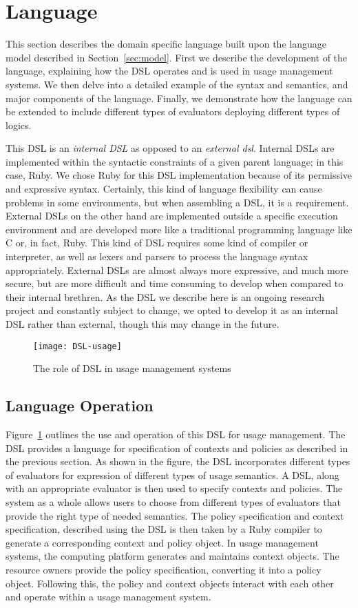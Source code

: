 \section{Language}\label{sec:language}
This section describes the domain specific language built upon the language model described in Section~\ref{sec:model}. First we describe the development of the language, explaining how the DSL operates and is used in usage management systems. We then delve into a detailed example of the syntax and semantics, and major components of the language. Finally, we demonstrate how the language can be extended to include different types of evaluators deploying different types of logics.

This DSL is an {\em internal DSL} as opposed to an {\em external dsl}.  Internal DSLs are implemented within the syntactic constraints of a given parent language; in this case, Ruby.  We chose Ruby for this DSL implementation because of its permissive and expressive syntax.  Certainly, this kind of language flexibility can cause problems in some environments, but when assembling a DSL, it is a requirement.  External DSLs on the other hand are implemented outside a specific execution environment and are developed more like a traditional programming language like C or, in fact, Ruby. This kind of DSL requires some kind of compiler or interpreter, as well as lexers and parsers to process the language syntax appropriately.  External DSLs are almost always more expressive, and much more secure, but are more difficult and time consuming to develop when compared to their internal brethren.  As the DSL we describe here is an ongoing research project and constantly subject to change, we opted to develop it as an internal DSL rather than external, though this may change in the future.

\begin{figure}[!t]
\centering
\texttt{[image: DSL-usage]}
\caption{The role of DSL in usage management systems}
\label{fig:DSL-usage}
\end{figure}

\subsection{Language Operation}
Figure~\ref{fig:DSL-usage} outlines the use and operation of this DSL for usage management. The DSL provides a language for specification of contexts and policies as described in the previous section. As shown in the figure, the DSL incorporates different types of evaluators for expression of different types of usage semantics. A DSL, along with an appropriate evaluator is then used to specify contexts and policies. The system as a whole allows users to choose from different types of evaluators that provide the right type of needed semantics. The policy specification and context specification, described using the DSL is then taken by a Ruby compiler to generate a corresponding context and policy object. In usage management systems, the computing platform generates and maintains context objects. The resource owners provide the policy specification, converting it into a policy object.  Following this, the policy and context objects interact with each other and operate within a usage management system.  

